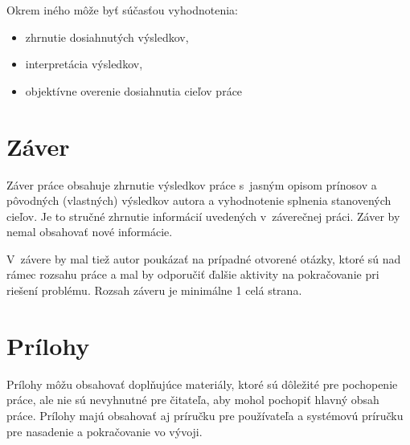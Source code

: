 Okrem iného môže byť súčasťou vyhodnotenia:
\begin{itemize}
  \item zhrnutie dosiahnutých výsledkov,
  \item interpretácia výsledkov,
  \item objektívne overenie dosiahnutia cieľov práce
\end{itemize}


\section*{Záver}

Záver práce obsahuje zhrnutie výsledkov práce s~jasným opisom prínosov a pôvodných (vlastných) výsledkov autora a vyhodnotenie splnenia stanovených cieľov. Je to stručné zhrnutie informácií uvedených v~záverečnej práci. Záver by nemal obsahovať nové informácie.

V~závere by mal tiež autor poukázať na prípadné otvorené otázky, ktoré sú nad rámec rozsahu práce a mal by odporučiť ďalšie aktivity na pokračovanie pri riešení problému. Rozsah záveru je minimálne 1 celá strana.


\section*{Prílohy}

Prílohy môžu obsahovať doplňujúce materiály, ktoré sú dôležité pre pochopenie práce, ale nie sú nevyhnutné pre čitateľa, aby mohol pochopiť hlavný obsah práce. Prílohy majú obsahovať aj príručku pre používateľa a systémovú príručku pre nasadenie a pokračovanie vo vývoji.
